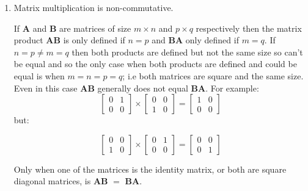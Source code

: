 \documentclass{tufte-book}
\begin{document}
\begin{enumerate}
	\item Matrix multiplication is non-commutative.

	      If \textbf{A} and \textbf{B} are matrices of size $m \times n$ and $p \times q$ respectively then the matrix
	      product \textbf{AB} is only defined if $n=p$ and \textbf{BA} only defined if $m=q$. If $n=p \ne m=q$ then both products
	      are defined but not the same size so can't be equal and so the only case when both products are defined and could be
	      equal is when $m=n=p=q$; i.e both matrices are square and the same size. Even in this case \textbf{AB} generally does
	      not equal \textbf{BA}. For example:
	      \begin{equation*}
		      \begin{bmatrix}
			      0 & 1 \\
			      0 & 0
		      \end{bmatrix}
		      \times
		      \begin{bmatrix}
			      0 & 0 \\
			      1 & 0
		      \end{bmatrix}
		      =
		      \begin{bmatrix}
			      1 & 0 \\
			      0 & 0
		      \end{bmatrix}
	      \end{equation*}
	      but:

	      \begin{equation*}
		      \begin{bmatrix}
			      0 & 0 \\
			      1 & 0
		      \end{bmatrix}
		      \times
		      \begin{bmatrix}
			      0 & 1 \\
			      0 & 0
		      \end{bmatrix}
		      =
		      \begin{bmatrix}
			      0 & 0 \\
			      0 & 1
		      \end{bmatrix}
	      \end{equation*}

	      Only when one of the matrices is the identity matrix, or both are square diagonal
	      matrices, is
	      \textbf{AB} $=$ \textbf{BA}.


\end{enumerate}
\end{document}
